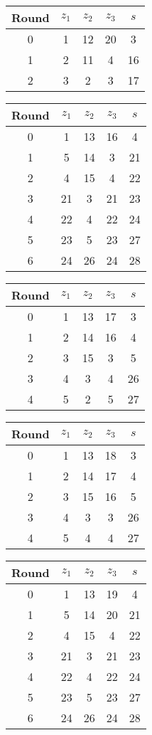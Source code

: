 \begin{multicols}{2}
\begin{tabular}{c | c | c | c | c }
Round & $z_1$ & $z_2$ & $z_3$ & $s$ \\
\hline
0 & 1 & 12 & 20 & 3 \\
1 & 2 & 11 & 4 & 16 \\
2 & 3 & 2 & 3 & 17
\end{tabular}


\begin{tabular}{c | c | c | c | c }
Round & $z_1$ & $z_2$ & $z_3$ & $s$ \\
\hline
0 & 1 & 13 & 16 & 4 \\
1 & 5 & 14 & 3 & 21 \\
2 & 4 & 15 & 4 & 22 \\
3 & 21 & 3 & 21 & 23 \\
4 & 22 & 4 & 22 & 24 \\
5 & 23 & 5 & 23 & 27 \\
6 & 24 & 26 & 24 & 28
\end{tabular}


\begin{tabular}{c | c | c | c | c }
Round & $z_1$ & $z_2$ & $z_3$ & $s$ \\
\hline
0 & 1 & 13 & 17 & 3 \\
1 & 2 & 14 & 16 & 4 \\
2 & 3 & 15 & 3 & 5 \\
3 & 4 & 3 & 4 & 26 \\
4 & 5 & 2 & 5 & 27
\end{tabular}


\begin{tabular}{c | c | c | c | c }
Round & $z_1$ & $z_2$ & $z_3$ & $s$ \\
\hline
0 & 1 & 13 & 18 & 3 \\
1 & 2 & 14 & 17 & 4 \\
2 & 3 & 15 & 16 & 5 \\
3 & 4 & 3 & 3 & 26 \\
4 & 5 & 4 & 4 & 27
\end{tabular}


\begin{tabular}{c | c | c | c | c }
Round & $z_1$ & $z_2$ & $z_3$ & $s$ \\
\hline
0 & 1 & 13 & 19 & 4 \\
1 & 5 & 14 & 20 & 21 \\
2 & 4 & 15 & 4 & 22 \\
3 & 21 & 3 & 21 & 23 \\
4 & 22 & 4 & 22 & 24 \\
5 & 23 & 5 & 23 & 27 \\
6 & 24 & 26 & 24 & 28
\end{tabular}



\end{multicols}
